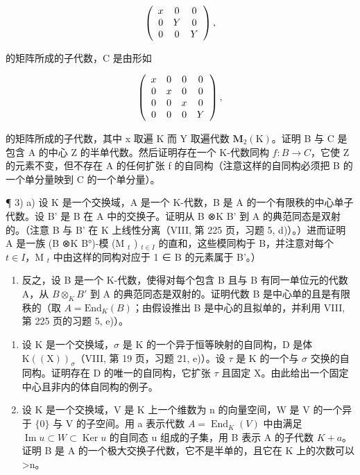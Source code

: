 \[
\left( \begin{array}{c c c} x & 0 & 0 \\ 0 & Y & 0 \\ 0 & 0 & Y \end{array} \right)  ,
\]

的矩阵所成的子代数，C 是由形如

\[
\left( \begin{array}{c c c c} x & 0 & 0 & 0 \\ 0 & x & 0 & 0 \\ 0 & 0 & x & 0 \\ 0 & 0 & 0 & Y \end{array} \right)  ,
\]

的矩阵所成的子代数，其中 x 取遍 K 而 Y 取遍代数 \(\mathbf{M}_{2}(\mathrm{K})\)。证明 B 与 C 是包含 A 的中心 Z 的半单代数。然后证明存在一个 K-代数同构 \(f: B \to C\)，它使 Z 的元素不变，但不存在 A 的任何扩张 f 的自同构（注意这样的自同构必须把 B 的一个单分量映到 C 的一个单分量）。

¶ 3) a) 设 K 是一个交换域，A 是一个 K-代数，B 是 A 的一个有限秩的中心单子代数。设 B' 是 B 在 A 中的交换子。证明从 B ⊗K B' 到 A 的典范同态是双射的。（注意 B 与 B' 在 K 上线性分离（VIII, 第 225 页，习题 5, d)）。）进而证明 A 是一族 (B ⊗K B°)-模 (M \(_{t}\) ) \(_{t\in I}\) 的直和，这些模同构于 B，并注意对每个 \(t\in I\)，M \(_{t}\) 中由这样的同构对应于 1 ∈ B 的元素属于 B'。）

\begin{enumerate}
\def\labelenumi{\alph{enumi})}
\setcounter{enumi}{1}
\tightlist
\item
  反之，设 B 是一个 K-代数，使得对每个包含 B 且与 B 有同一单位元的代数 A，从 \(B \otimes_{K} B'\) 到 A 的典范同态是双射的。证明代数 B 是中心单的且是有限秩的（取 \(A = \text{End}_{K}(B)\)；由假设推出 B 是中心的且拟单的，并利用 VIII, 第 225 页的习题 5, e)）。
\end{enumerate}

\begin{enumerate}
\def\labelenumi{\arabic{enumi})}
\setcounter{enumi}{3}
\item
  设 \(\mathrm{K}\) 是一个交换域，\(\sigma\) 是 \(\mathrm{K}\) 的一个异于恒等映射的自同构，\(\mathrm{D}\) 是体 \(\mathrm{K}((\mathrm{X}))_{\sigma}\)（VIII, 第 19 页，习题 21, e)）。设 \(\tau\) 是 \(\mathrm{K}\) 的一个与 \(\sigma\) 交换的自同构。证明存在 \(\mathrm{D}\) 的唯一的自同构，它扩张 \(\tau\) 且固定 X。由此给出一个固定中心且非内的体自同构的例子。
\item
  设 K 是一个交换域，V 是 K 上一个维数为 n 的向量空间，W 是 V 的一个异于 \(\{0\}\) 与 V 的子空间。用 a 表示代数 \(A = \operatorname{End}_{K}(V)\) 中由满足 \(\operatorname{Im} u \subset W \subset \operatorname{Ker} u\) 的自同态 u 组成的子集，用 B 表示 A 的子代数 \(K + a\)。证明 B 是 A 的一个极大交换子代数，它不是半单的，且它在 K 上的次数可以 \textgreater n。
\end{enumerate}

